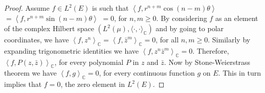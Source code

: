 \documentclass[12pt,a4paper,twoside]{article}
\numberwithin{equation}{section}
\theoremstyle{definition}  %
\theoremstyle{plain}  %
\theoremstyle{remark} %
\begin{document}
\begin{proof}
  Assume $f \in L^{2}(E)$ is such that $\left\langle f, r^{n+m}\cos (n-m)\theta \right\rangle $  $ = \left\langle f, r^{n+m}\sin (n-m)\theta \right\rangle $ $= 0$, for $n,m \geq 0$. By considering $f$ as  an element of the complex Hilbert space $(L^{2}(\mu), \langle \cdot, \cdot \rangle_{\mathbb{C}})$ and by going to polar coordinates, we have $\left\langle f, z^n \right\rangle_{\mathbb{C}} = \left\langle f, \bar{z}^{m} \right\rangle_{\mathbb{C}} = 0 $, for all $n,m \geq 0$. Similarly by expanding trigonometric identities we have $\left\langle f, z^{n}\bar{z}^{m} \right\rangle_{\mathbb{C}} = 0$. %
 Therefore, $\left\langle f, P(z, \bar{z}) \right\rangle_{\mathbb{C}}$, for every polynomial $P$ in $z$ and $\bar{z}$. Now by Stone-Weierstrass theorem we have $\left\langle f, g \right\rangle_{\mathbb{C}} = 0$, for every continuous function $g$ on $E$. This in turn implies that $f=0$, the zero element in $L^2(E)$.
\end{proof}
\end{document}
